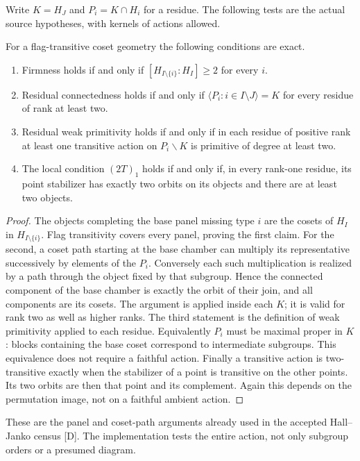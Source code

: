 Write $K=H_J$ and $P_i=K\cap H_i$ for a residue. The following tests
are the actual source hypotheses, with kernels of actions allowed.
\begin{lemma}\label{filters}
For a flag-transitive coset geometry the following conditions are exact.
\begin{enumerate}
\item Firmness holds if and only if $[H_{I\setminus\{i\}}:H_I]\ge2$
for every $i$.
\item Residual connectedness holds if and only if
$\langle P_i:i\in I\setminus J\rangle=K$ for every residue of rank
at least two.
\item Residual weak primitivity holds if and only if in each residue of
positive rank at least one transitive action on $P_i\backslash K$ is
primitive of degree at least two.
\item The local condition $(2T)_1$ holds if and only if, in every
rank-one residue, its point stabilizer has exactly two orbits on its
objects and there are at least two objects.
\end{enumerate}
\end{lemma}
\begin{proof}
The objects completing the base panel missing type $i$ are the cosets
of $H_I$ in $H_{I\setminus\{i\}}$. Flag transitivity covers every panel,
proving the first claim. For the second, a coset path starting at the base
chamber can multiply its representative successively by elements of the
$P_i$. Conversely each such multiplication is realized by a path through
the object fixed by that subgroup. Hence the connected component of the
base chamber is exactly the orbit of their join, and all components are
its cosets. The argument is applied inside each $K$; it is valid for
rank two as well as higher ranks. The third statement is the definition
of weak primitivity applied to each residue. Equivalently $P_i$ must be
maximal proper in $K$: blocks containing the base coset correspond to
intermediate subgroups. This equivalence does not require a faithful
action. Finally a transitive action is two-transitive exactly when the
stabilizer of a point is transitive on the other points. Its two orbits
are then that point and its complement. Again this depends on the
permutation image, not on a faithful ambient action.
\end{proof}
These are the panel and coset-path arguments already used in the accepted
Hall--Janko census [D]. The implementation tests the entire action, not
only subgroup orders or a presumed diagram.

